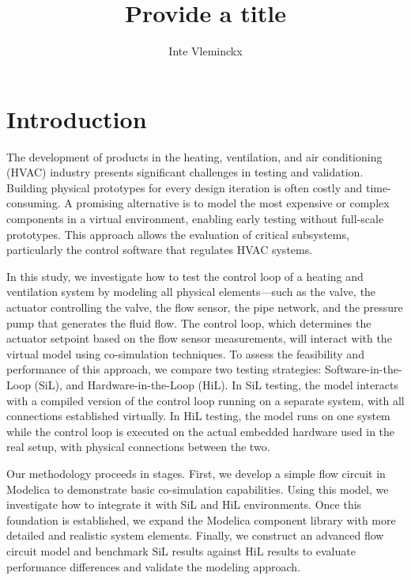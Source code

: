 \documentclass[we,final,11pt,oneside,openany]{uantwerpenbamathesis}
\title{Provide a title}
\author{Inte Vleminckx}
\begin{document}
\maketitle

\frontmatter

\tableofcontents

\mainmatter

\chapter{Introduction}
\label{ch:introduction}

The development of products in the heating, ventilation, and air conditioning (HVAC) industry presents significant challenges in testing and validation.
Building physical prototypes for every design iteration is often costly and time-consuming.
A promising alternative is to model the most expensive or complex components in a virtual environment, enabling early testing without full-scale prototypes.
This approach allows the evaluation of critical subsystems, particularly the control software that regulates HVAC systems.

In this study, we investigate how to test the control loop of a heating and ventilation system by modeling all physical elements—such as the valve, the actuator controlling the valve, the flow sensor, the pipe network, and the pressure pump that generates the fluid flow.
The control loop, which determines the actuator setpoint based on the flow sensor measurements, will interact with the virtual model using co-simulation techniques.
To assess the feasibility and performance of this approach, we compare two testing strategies: Software-in-the-Loop (SiL), and Hardware-in-the-Loop (HiL).
In SiL testing, the model interacts with a compiled version of the control loop running on a separate system, with all connections established virtually.
In HiL testing, the model runs on one system while the control loop is executed on the actual embedded hardware used in the real setup, with physical connections between the two.

Our methodology proceeds in stages.
First, we develop a simple flow circuit in Modelica to demonstrate basic co-simulation capabilities.
Using this model, we investigate how to integrate it with SiL and HiL environments.
Once this foundation is established, we expand the Modelica component library with more detailed and realistic system elements.
Finally, we construct an advanced flow circuit model and benchmark SiL results against HiL results to evaluate performance differences and validate the modeling approach.
\end{document}
